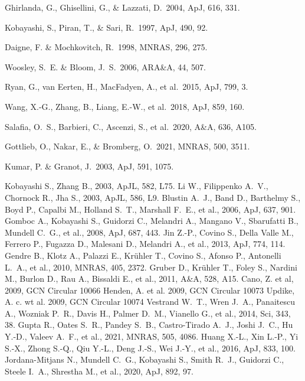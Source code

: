 \documentclass{naturesubmissionstyle}
\newcommand\aap{A\&A}                %
\newcommand\apj{ApJ}                 %
\newcommand\araa{ARA\&A}             %
\newcommand\mnras{MNRAS}             %
\begin{document}
\begin{thebibliography}{10}
 Ghirlanda, G., Ghisellini, G., \& Lazzati, D.\ 2004, \apj, 616, 331. 

 Kobayashi, S., Piran, T., \& Sari, R.\ 1997, \apj, 490, 92. 

 Daigne, F. \& Mochkovitch, R.\ 1998, \mnras, 296, 275. 

 Woosley, S.~E. \& Bloom, J.~S.\ 2006, \araa, 44, 507. 

 Ryan, G., van Eerten, H., MacFadyen, A., et al.\ 2015, \apj, 799, 3. 

 Wang, X.-G., Zhang, B., Liang, E.-W., et al.\ 2018, \apj, 859, 160. 

 Salafia, O.~S., Barbieri, C., Ascenzi, S., et al.\ 2020, \aap, 636, A105. 

 Gottlieb, O., Nakar, E., \& Bromberg, O.\ 2021, \mnras, 500, 3511. 

 Kumar, P. \& Granot, J.\ 2003, \apj, 591, 1075. 



 Kobayashi S., Zhang B., 2003, ApJL, 582, L75. 
 Li W., Filippenko A.~V., Chornock R., Jha S., 2003, ApJL, 586, L9. 
 Blustin A.~J., Band D., Barthelmy S., Boyd P., Capalbi M., Holland S.~T., Marshall F.~E., et al., 2006, ApJ, 637, 901. 
 Gomboc A., Kobayashi S., Guidorzi C., Melandri A., Mangano V., Sbarufatti B., Mundell C.~G., et al., 2008, ApJ, 687, 443. 
 Jin Z.-P., Covino S., Della Valle M., Ferrero P., Fugazza D., Malesani D., Melandri A., et al., 2013, ApJ, 774, 114. 
 Gendre B., Klotz A., Palazzi E., Kr{\"u}hler T., Covino S., Afonso P., Antonelli L.~A., et al., 2010, MNRAS, 405, 2372. 
 Gruber D., Kr{\"u}hler T., Foley S., Nardini M., Burlon D., Rau A., Bissaldi E., et al., 2011, A\&A, 528, A15. 
 Cano, Z. et al, 2009, GCN Circular 10066 %
 Henden, A. et al. 2009, GCN Circular 10073 %
 Updike, A. c. wt al. 2009, GCN Circular 10074 %
 Vestrand W.~T., Wren J.~A., Panaitescu A., Wozniak P.~R., Davis H., Palmer D.~M., Vianello G., et al., 2014, Sci, 343, 38. 
 Gupta R., Oates S.~R., Pandey S.~B., Castro-Tirado A.~J., Joshi J.~C., Hu Y.-D., Valeev A.~F., et al., 2021, MNRAS, 505, 4086. 
 Huang X.-L., Xin L.-P., Yi S.-X., Zhong S.-Q., Qiu Y.-L., Deng J.-S., Wei J.-Y., et al., 2016, ApJ, 833, 100. 
 Jordana-Mitjans N., Mundell C.~G., Kobayashi S., Smith R.~J., Guidorzi C., Steele I.~A., Shrestha M., et al., 2020, ApJ, 892, 97. 



\setcounter{firstbib}{\value{NAT@ctr}}

\end{thebibliography}
\end{document}
